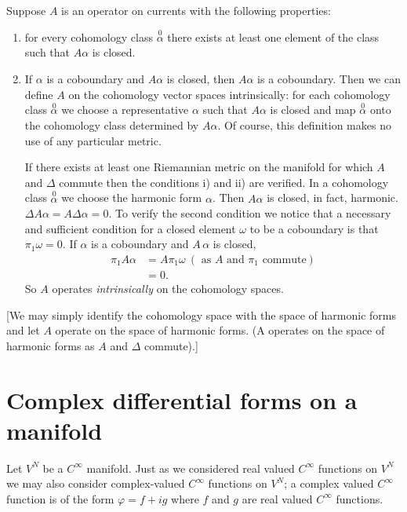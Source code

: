 Suppose $A$ is an operator on currents with the following properties:
\begin{enumerate}
\renewcommand{\theenumi}{\roman{enumi}}
\renewcommand{\labelenumi}{\theenumi)}
\item for every cohomology class $\overset{0}{\alpha}$ there exists at
  least one element of the class such that $A\alpha$ is closed.

\item If $\alpha$ is a coboundary and $A\alpha$ is closed, then
  $A\alpha$ is a coboundary. Then we can define $A$ on the cohomology
  vector spaces intrinsically: for each cohomology class
  $\overset{0}{\alpha}$ we choose a representative $\alpha$ such that
  $A\alpha$ is closed and map $\overset{0}{\alpha}$ onto the
  cohomology class determined by $A\alpha$. Of course, this definition
  makes no use of any particular metric.

If there exists at least one Riemannian metric on the manifold for
which $A$ and $\Delta$ commute then the conditions i) and ii) are
verified. In a cohomology class $\overset{0}{\alpha}$ we choose the
harmonic form $\alpha$. Then $A\alpha$ is closed, in fact,
harmonic. $\Delta A\alpha=A\Delta\alpha=0$. To verify the second
condition we notice that a necessary and sufficient condition for a
closed element $\omega$ to be a coboundary is that
$\pi_{1}\omega=0$. If $\alpha$ is a coboundary and $A\,\alpha$ is closed,
\begin{align*}
\pi_{1}A\alpha &= A\pi_{1}\omega~(\text{ as } A\text{ and }
\pi_{1}\text{ commute})\\
&= 0.
\end{align*}\pageoriginale
So $A$ operates {\em intrinsically} on the cohomology spaces.
\end{enumerate}

[We may simply identify the cohomology space with the space of
  harmonic forms and let $A$ operate on the space of harmonic
  forms. (A operates on the space of harmonic forms as $A$ and
  $\Delta$ commute).]

\section*{Complex differential forms on a manifold}

Let $V^{N}$ be a $C^{\infty}$ manifold. Just as we considered real
valued $C^{\infty}$ functions on $V^{N}$ we may also consider
complex-valued $C^{\infty}$ functions on $V^{N}$; a complex valued
$C^{\infty}$ function is of the form $\varphi=f+ig$ where $f$ and $g$
are real valued $C^{\infty}$ functions.

